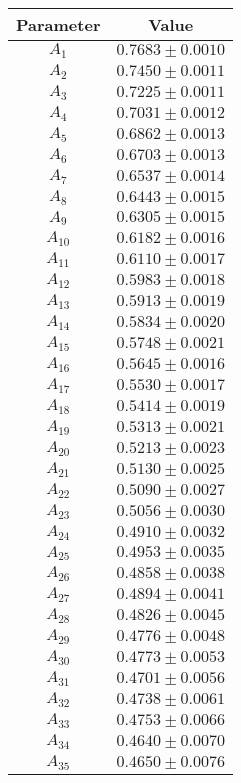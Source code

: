 \begin{tabular}{c|c}
Parameter & Value\\
\hline
$A_{1}$ & $0.7683\pm0.0010$ \\
$A_{2}$ & $0.7450\pm0.0011$ \\
$A_{3}$ & $0.7225\pm0.0011$ \\
$A_{4}$ & $0.7031\pm0.0012$ \\
$A_{5}$ & $0.6862\pm0.0013$ \\
$A_{6}$ & $0.6703\pm0.0013$ \\
$A_{7}$ & $0.6537\pm0.0014$ \\
$A_{8}$ & $0.6443\pm0.0015$ \\
$A_{9}$ & $0.6305\pm0.0015$ \\
$A_{10}$ & $0.6182\pm0.0016$ \\
$A_{11}$ & $0.6110\pm0.0017$ \\
$A_{12}$ & $0.5983\pm0.0018$ \\
$A_{13}$ & $0.5913\pm0.0019$ \\
$A_{14}$ & $0.5834\pm0.0020$ \\
$A_{15}$ & $0.5748\pm0.0021$ \\
$A_{16}$ & $0.5645\pm0.0016$ \\
$A_{17}$ & $0.5530\pm0.0017$ \\
$A_{18}$ & $0.5414\pm0.0019$ \\
$A_{19}$ & $0.5313\pm0.0021$ \\
$A_{20}$ & $0.5213\pm0.0023$ \\
$A_{21}$ & $0.5130\pm0.0025$ \\
$A_{22}$ & $0.5090\pm0.0027$ \\
$A_{23}$ & $0.5056\pm0.0030$ \\
$A_{24}$ & $0.4910\pm0.0032$ \\
$A_{25}$ & $0.4953\pm0.0035$ \\
$A_{26}$ & $0.4858\pm0.0038$ \\
$A_{27}$ & $0.4894\pm0.0041$ \\
$A_{28}$ & $0.4826\pm0.0045$ \\
$A_{29}$ & $0.4776\pm0.0048$ \\
$A_{30}$ & $0.4773\pm0.0053$ \\
$A_{31}$ & $0.4701\pm0.0056$ \\
$A_{32}$ & $0.4738\pm0.0061$ \\
$A_{33}$ & $0.4753\pm0.0066$ \\
$A_{34}$ & $0.4640\pm0.0070$ \\
$A_{35}$ & $0.4650\pm0.0076$ \\

\end{tabular}
